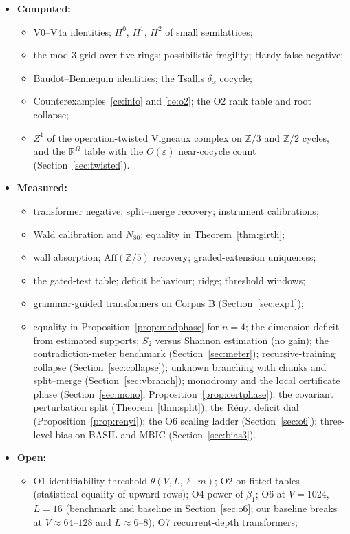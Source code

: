 \documentclass[11pt]{article}
\theoremstyle{definition}
\theoremstyle{remark}
\newcommand{\Z}{\mathbb{Z}}
\newcommand{\R}{\mathbb{R}}
\newcommand{\Aff}{\mathrm{Aff}}
\begin{document}
\begin{itemize}
\begin{itemize}
  \end{itemize}
  \item \textbf{Computed:}
  \begin{itemize}
    \item V0--V4a identities; $H^0$, $H^1$, $H^2$ of small semilattices;
    \item the mod-3 grid over five rings; possibilistic fragility; Hardy false negative;
    \item Baudot--Bennequin identities; the Tsallis $\delta_\alpha$ cocycle;
    \item Counterexamples~\ref{ce:info} and \ref{ce:o2}; the O2 rank table and root collapse;
    \item $Z^1$ of the operation-twisted Vigneaux complex on $\Z/3$ and $\Z/2$ cycles, and the $\R^\Omega$ table with the $O(\varepsilon)$ near-cocycle count (Section~\ref{sec:twisted}).
  \end{itemize}
  \item \textbf{Measured:}
  \begin{itemize}
    \item transformer negative; split--merge recovery; instrument calibrations;
    \item Wald calibration and $N_{80}$; equality in Theorem~\ref{thm:girth};
    \item wall absorption; $\Aff(\Z/5)$ recovery; graded-extension uniqueness;
    \item the gated-test table; deficit behaviour; ridge; threshold windows;
    \item grammar-guided transformers on Corpus B (Section~\ref{sec:exp1});
    \item equality in Proposition~\ref{prop:modphase} for $n=4$; the dimension deficit from estimated supports; $S_2$ versus Shannon estimation (no gain); the contradiction-meter benchmark (Section~\ref{sec:meter}); recursive-training collapse (Section~\ref{sec:collapse}); unknown branching with chunks and split--merge (Section~\ref{sec:vbranch}); monodromy and the local certificate phase (Section~\ref{sec:mono}, Proposition~\ref{prop:certphase}); the covariant perturbation split (Theorem~\ref{thm:split}); the R\'enyi deficit dial (Proposition~\ref{prop:renyi}); the O6 scaling ladder (Section~\ref{sec:o6}); three-level bias on BASIL and MBIC (Section~\ref{sec:bias3}).
  \end{itemize}
  \item \textbf{Open:}
  \begin{itemize}
    \item O1 identifiability threshold $\theta(V,L,\ell,m)$; O2 on fitted tables (statistical equality of upward rows); O4 power of $\beta_1$; O6 at $V=1024$, $L=16$ (benchmark and baseline in Section~\ref{sec:o6}; our baseline breaks at $V\approx64$--$128$ and $L\approx6$--$8$); O7 recurrent-depth transformers;

\end{itemize}
\end{itemize}
\end{document}
